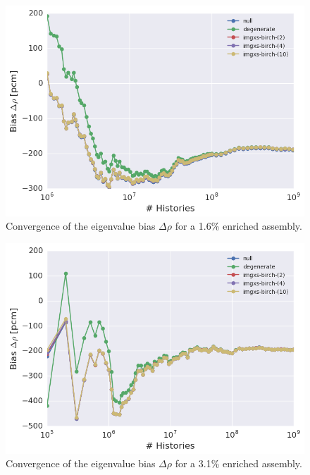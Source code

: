 \begin{figure}[h!]
\centering
\includegraphics[width=0.87\linewidth]{figures/results/convergence/assm-16/keff-bias-evo}
\vspace{2mm}
\caption[Eigenvalue bias covergence for a 1.6\% enriched assembly]{Convergence of the eigenvalue bias $\Delta\rho$ for a 1.6\% enriched assembly.}
\label{fig:chap11-assm-1.6-eigenvalue-converge}
\end{figure}

\begin{figure}[h!]
\centering
\includegraphics[width=0.87\linewidth]{figures/results/convergence/assm-31/keff-bias-evo}
\vspace{2mm}
\caption[Eigenvalue bias covergence for a 3.1\% enriched assembly]{Convergence of the eigenvalue bias $\Delta\rho$ for a 3.1\% enriched assembly.}
\label{fig:chap11-assm-3.1-eigenvalue-converge}
\end{figure}

